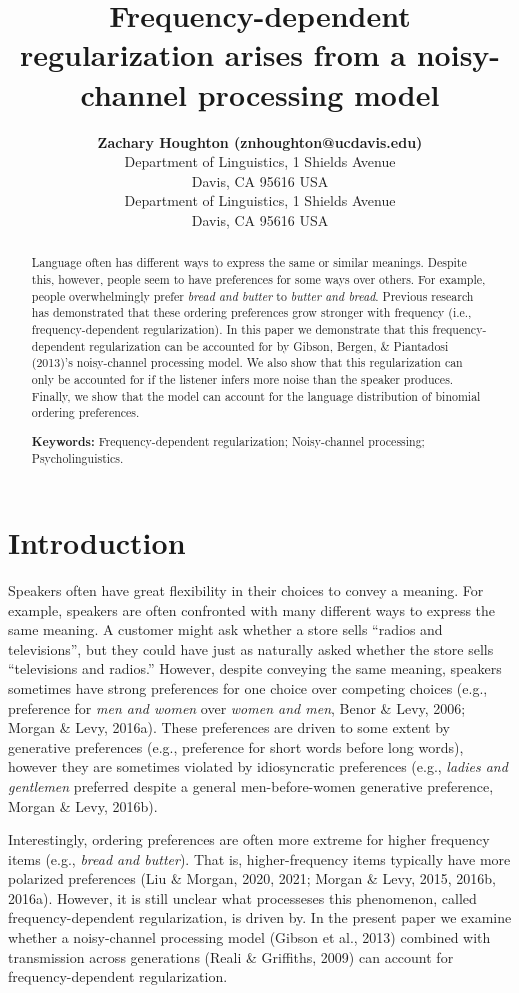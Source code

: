 \documentclass[10pt, letterpaper]{article}
\title{Frequency-dependent regularization arises from a noisy-channel
processing model}
\author{{\large \bf Zachary Houghton (znhoughton@ucdavis.edu)} \\ Department of Linguistics, 1 Shields Avenue \\ Davis, CA 95616 USA \AND {\large \bf Emily Morgan (eimorgan@ucdavis.edu)} \\ Department of Linguistics, 1 Shields Avenue \\ Davis, CA 95616 USA}
\begin{document}
\maketitle

\begin{abstract}
Language often has different ways to express the same or similar
meanings. Despite this, however, people seem to have preferences for
some ways over others. For example, people overwhelmingly prefer
\emph{bread and butter} to \emph{butter and bread}. Previous research
has demonstrated that these ordering preferences grow stronger with
frequency (i.e., frequency-dependent regularization). In this paper we
demonstrate that this frequency-dependent regularization can be
accounted for by Gibson, Bergen, \& Piantadosi (2013)'s noisy-channel
processing model. We also show that this regularization can only be
accounted for if the listener infers more noise than the speaker
produces. Finally, we show that the model can account for the language
distribution of binomial ordering preferences.

\textbf{Keywords:}
Frequency-dependent regularization; Noisy-channel processing;
Psycholinguistics.
\end{abstract}

\hypertarget{introduction}{%
\section{Introduction}\label{introduction}}

Speakers often have great flexibility in their choices to convey a
meaning. For example, speakers are often confronted with many different
ways to express the same meaning. A customer might ask whether a store
sells ``radios and televisions'', but they could have just as naturally
asked whether the store sells ``televisions and radios.'' However,
despite conveying the same meaning, speakers sometimes have strong
preferences for one choice over competing choices (e.g., preference for
\emph{men and women} over \emph{women and men}, Benor \& Levy, 2006;
Morgan \& Levy, 2016a). These preferences are driven to some extent by
generative preferences (e.g., preference for short words before long
words), however they are sometimes violated by idiosyncratic preferences
(e.g., \emph{ladies and gentlemen} preferred despite a general
men-before-women generative preference, Morgan \& Levy, 2016b).

Interestingly, ordering preferences are often more extreme for higher
frequency items (e.g., \emph{bread and butter}). That is,
higher-frequency items typically have more polarized preferences (Liu \&
Morgan, 2020, 2021; Morgan \& Levy, 2015, 2016b, 2016a). However, it is
still unclear what processeses this phenomenon, called
frequency-dependent regularization, is driven by. In the present paper
we examine whether a noisy-channel processing model (Gibson et al.,
2013) combined with transmission across generations (Reali \& Griffiths,
2009) can account for frequency-dependent regularization.
\end{document}
